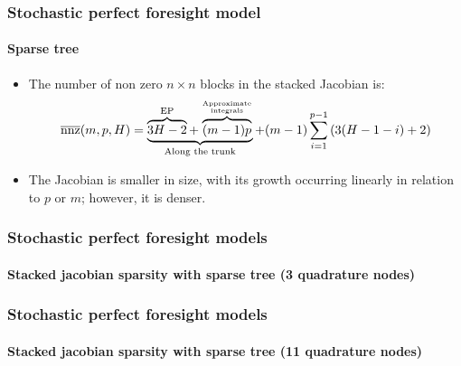 \documentclass{beamer}
\begin{document}
\begin{frame}
   \frametitle{Stochastic perfect foresight model}
   \framesubtitle{Sparse tree}

   \begin{itemize}

      \item The number of non zero $n\times n$ blocks in the stacked Jacobian is:
            {\small
            \[
               \overline{\mathrm{nnz}}(m,p,H) = \underbrace{\overbrace{3H-2}^{\mathrm{EP}} + \overbrace{(m-1)p}^{\text{Approximate} \atop \text{integrals} }}_{\text{Along the trunk}} + (m-1)\sum_{i=1}^{p-1} \left( 3(H-1-i)+2  \right)
            \]}

            \medskip

      \item The Jacobian is smaller in size, with its growth occurring linearly in relation to \( p \) or \( m \); however, it is denser.

   \end{itemize}

\end{frame}


\begin{frame}
   \frametitle{Stochastic perfect foresight models}
   \framesubtitle{Stacked jacobian sparsity with sparse tree (3 quadrature nodes)}
   \begin{center}
      \scalebox{.5}{
         }
   \end{center}

\end{frame}


\begin{frame}
   \frametitle{Stochastic perfect foresight models}
   \framesubtitle{Stacked jacobian sparsity with sparse tree (11 quadrature nodes)}
   \begin{center}
      \scalebox{.5}{
         }
   \end{center}

\end{frame}
\end{document}
